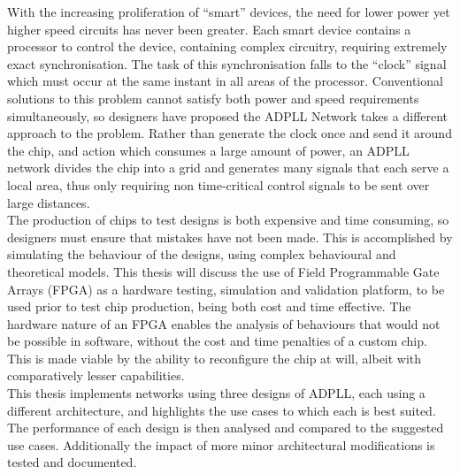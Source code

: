 \documentclass[11pt,english,british]{report}
\begin{document}
With the increasing proliferation of ``smart'' devices, the need for lower power yet higher speed circuits has never been greater. Each smart device contains a processor to control the device, containing complex circuitry, requiring extremely exact synchronisation. The task of this synchronisation falls to the ``clock'' signal which must occur at the same instant in all areas of the processor. Conventional solutions to this problem cannot satisfy both power and speed requirements simultaneously, so designers have proposed the ADPLL Network takes a different approach to the problem. Rather than generate the clock once and send it around the chip, and action which consumes a large amount of power, an ADPLL network divides the chip into a grid and generates many signals that each serve a local area, thus only requiring non time-critical control signals to be sent over large distances.\\
The production of chips to test designs is both expensive and time consuming, so designers must ensure that mistakes have not been made. This is accomplished by simulating the behaviour of the designs, using complex behavioural and theoretical models. This thesis will discuss the use of Field Programmable Gate Arrays (FPGA) as a hardware testing, simulation and validation platform, to be used prior to test chip production, being both cost and time effective. The hardware nature of an FPGA enables the analysis of behaviours that would not be possible in software, without the cost and time penalties of a custom chip. This is made viable by the ability to reconfigure the chip at will, albeit with comparatively lesser capabilities.\\
This thesis implements networks using three designs of ADPLL, each using a different architecture, and highlights the use cases to which each is best suited. The performance of each design is then analysed and compared to the suggested use cases. Additionally the impact of more minor architectural modifications is tested and documented.
\end{document}
